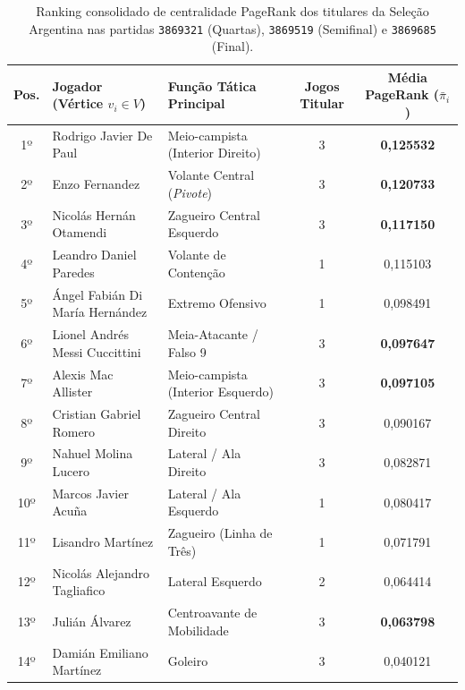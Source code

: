 \documentclass[10pt,a4paper]{article}
\theoremstyle{definition}
\theoremstyle{plain}
\theoremstyle{remark}
\begin{document}
\begin{table}[H]
\centering
\caption{Ranking consolidado de centralidade PageRank dos titulares da Seleção Argentina nas partidas \texttt{3869321} (Quartas), \texttt{3869519} (Semifinal) e \texttt{3869685} (Final).}
\label{tab:resultados_pagerank}
\vspace{0.05cm}
\footnotesize
\begin{tabularx}{\linewidth}{c X l c c}
\toprule
\textbf{Pos.} & \textbf{Jogador (Vértice $v_i \in V$)} & \textbf{Função Tática Principal} & \textbf{Jogos Titular} & \textbf{Média PageRank ($\bar{\pi}_i$)} \\
\midrule
1º  & Rodrigo Javier De Paul              & Meio-campista (Interior Direito) & 3 & \textbf{0,125532} \\
2º  & Enzo Fernandez                      & Volante Central (\textit{Pivote}) & 3 & \textbf{0,120733} \\
3º  & Nicolás Hernán Otamendi             & Zagueiro Central Esquerdo         & 3 & \textbf{0,117150} \\
4º  & Leandro Daniel Paredes              & Volante de Contenção              & 1 & 0,115103 \\
5º  & Ángel Fabián Di María Hernández     & Extremo Ofensivo                  & 1 & 0,098491 \\
6º  & Lionel Andrés Messi Cuccittini      & Meia-Atacante / Falso 9           & 3 & \textbf{0,097647} \\
7º  & Alexis Mac Allister                 & Meio-campista (Interior Esquerdo) & 3 & \textbf{0,097105} \\
8º  & Cristian Gabriel Romero             & Zagueiro Central Direito          & 3 & 0,090167 \\
9º  & Nahuel Molina Lucero                & Lateral / Ala Direito             & 3 & 0,082871 \\
10º & Marcos Javier Acuña                 & Lateral / Ala Esquerdo            & 1 & 0,080417 \\
11º & Lisandro Martínez                   & Zagueiro (Linha de Três)          & 1 & 0,071791 \\
12º & Nicolás Alejandro Tagliafico        & Lateral Esquerdo                  & 2 & 0,064414 \\
13º & Julián Álvarez                      & Centroavante de Mobilidade        & 3 & \textbf{0,063798} \\
14º & Damián Emiliano Martínez            & Goleiro                           & 3 & 0,040121 \\
\bottomrule
\end{tabularx}
\end{table}
\end{document}
